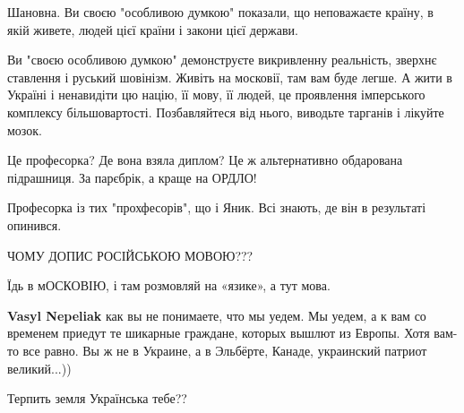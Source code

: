 \begin{itemize}
Шановна. Ви своєю "особливою думкою" показали, що неповажаєте країну, в якій
живете, людей цієї країни і закони цієї держави.

Ви "своєю особливою думкою" демонструєте викривленну реальність, зверхнє
ставлення і руський шовінізм. Живіть на московії, там вам буде легше. А жити в
Україні і ненавидіти цю націю, її мову, її людей, це проявлення імперського
комплексу більшовартості. Позбавляйтеся від нього, виводьте тарганів і лікуйте
мозок.



Це професорка? Де вона взяла диплом? Це ж альтернативно обдарована підрашниця. За парєбрік, а краще на ОРДЛО!


Професорка із тих "прохфесорів", що і Яник. Всі знають, де він в результаті опинився.


ЧОМУ ДОПИС РОСІЙСЬКОЮ МОВОЮ???


Їдь в мОСКОВІЮ, і там розмовляй на «язике», а тут мова.

\begin{itemize}

\textbf{Vasyl Nepeliak} как вы не понимаете, что мы уедем. Мы уедем, а к вам со временем приедут те шикарные граждане, которых вышлют из Европы. Хотя вам-то все равно. Вы ж не в Украине, а в Эльбёрте, Канаде, украинский патриот великий...))
\end{itemize}


Терпить земля Українська тебе??



\end{itemize}
